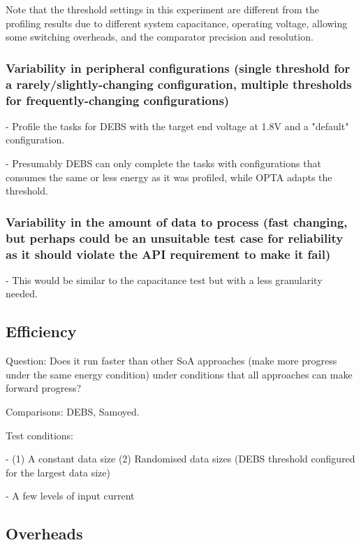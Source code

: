 Note that the threshold settings in this experiment are different from the profiling results due to different system capacitance, operating voltage, allowing some switching overheads, and the comparator precision and resolution. 

\subsubsection{Variability in peripheral configurations (single threshold for a rarely/slightly-changing configuration, multiple thresholds for frequently-changing configurations)}

- Profile the tasks for DEBS with the target end voltage at 1.8V and a "default" configuration. 
    
- Presumably DEBS can only complete the tasks with configurations that consumes the same or less energy as it was profiled, while OPTA adapts the threshold. 

\subsubsection{Variability in the amount of data to process (fast changing, but perhaps could be an unsuitable test case for reliability as it should violate the API requirement to make it fail)}
    
- This would be similar to the capacitance test but with a less granularity needed.

\subsection{Efficiency}

Question: Does it run faster than other SoA approaches (make more progress under the same energy condition) under conditions that all approaches can make forward progress?

Comparisons: DEBS, Samoyed.

Test conditions:
    
- (1) A constant data size (2) Randomised data sizes (DEBS threshold configured for the largest data size)

- A few levels of input current

\subsection{Overheads}


